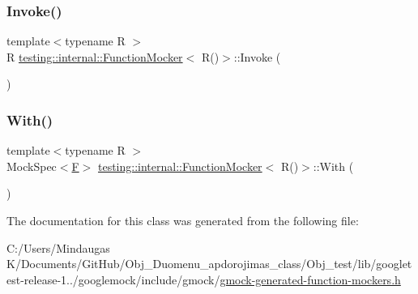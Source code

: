 \subsubsection{\texorpdfstring{Invoke()}{Invoke()}}
{\footnotesize\ttfamily template$<$typename R $>$ \\
R \mbox{\hyperlink{classtesting_1_1internal_1_1_function_mocker}{testing\+::internal\+::\+Function\+Mocker}}$<$ R()$>$\+::Invoke (\begin{DoxyParamCaption}{ }\end{DoxyParamCaption})\hspace{0.3cm}{\ttfamily [inline]}}

\mbox{\label{classtesting_1_1internal_1_1_function_mocker_3_01_r_07_08_4_a4bd0ee604f6917fcfe8aae52a1f47cf3}} 
\subsubsection{\texorpdfstring{With()}{With()}}
{\footnotesize\ttfamily template$<$typename R $>$ \\
Mock\+Spec$<$\mbox{\hyperlink{classtesting_1_1internal_1_1_function_mocker_3_01_r_07_08_4_a2c1d7da413176d87405227df90a95521}{F}}$>$ \mbox{\hyperlink{classtesting_1_1internal_1_1_function_mocker}{testing\+::internal\+::\+Function\+Mocker}}$<$ R()$>$\+::With (\begin{DoxyParamCaption}{ }\end{DoxyParamCaption})\hspace{0.3cm}{\ttfamily [inline]}}



The documentation for this class was generated from the following file\+:\begin{DoxyCompactItemize}
\item 
C\+:/\+Users/\+Mindaugas K/\+Documents/\+Git\+Hub/\+Obj\+\_\+\+Duomenu\+\_\+apdorojimas\+\_\+class/\+Obj\+\_\+test/lib/googletest-\/release-\/1../googlemock/include/gmock/\mbox{\hyperlink{_obj__test_2lib_2googletest-release-1_88_81_2googlemock_2include_2gmock_2gmock-generated-function-mockers_8h}{gmock-\/generated-\/function-\/mockers.\+h}}\end{DoxyCompactItemize}
